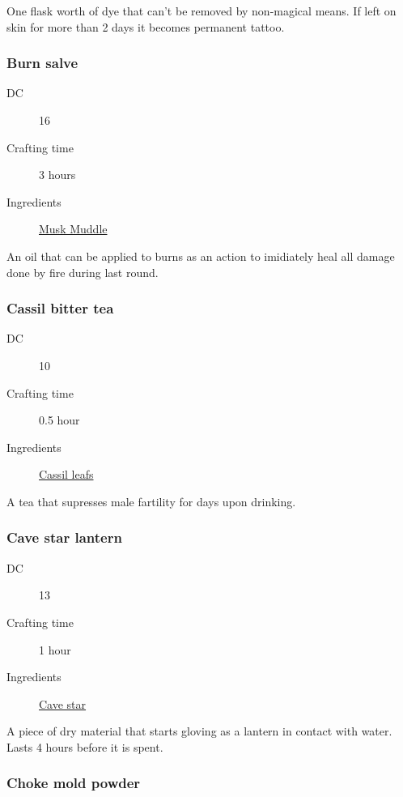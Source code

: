 One flask worth of dye that can't be removed by non-magical means. 
If left on skin for more than 2 days it becomes permanent tattoo.

\subsubsection{Burn salve}
\label{Burn salve}

\begin{description}
\item [DC] 16 \medicine
\item [Crafting time] 3 hours
\item [Ingredients] \hyperref[Musk Muddle]{Musk Muddle}
\end{description}

An oil that can be applied to burns as an action to imidiately heal all damage done by fire 
during last round.

\subsubsection{Cassil bitter tea}
\label{Cassil bitter tea}

\begin{description}
\item [DC] 10 \medicine
\item [Crafting time] 0.5 hour
\item [Ingredients] \hyperref[Cassil]{Cassil leafs}
\end{description}

A tea that supresses male fartility for  days upon drinking.

\subsubsection{Cave star lantern}
\label{Cave star lantern}

\begin{description}
\item [DC] 13 \nature
\item [Crafting time] 1 hour
\item [Ingredients] \hyperref[Cave star]{Cave star}
\end{description}

A piece of dry material that starts gloving as a lantern in contact with water. Lasts 4 hours before it is spent.

\subsubsection{Choke mold powder}
\label{Choke mold powder}

